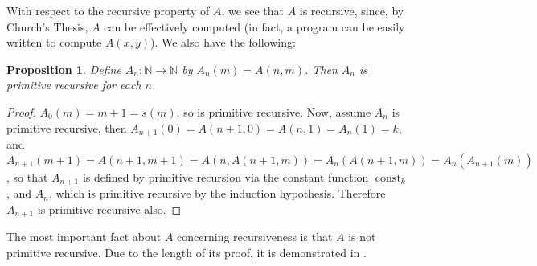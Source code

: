 \documentclass[12pt]{article}
\newtheorem{prop}{Proposition}
\begin{document}
With respect to the recursive property of $A$, we see that $A$ is recursive, since, by Church's Thesis, $A$ can be effectively computed (in fact, a program can be easily written to compute $A(x,y)$).  We also have the following:
\begin{prop} Define $A_n:\mathbb{N} \to \mathbb{N}$ by $A_n(m)= A(n,m)$.  Then $A_n$ is primitive recursive for each $n$.  \end{prop}
\begin{proof}  $A_0(m)=m+1=s(m)$, so is primitive recursive.  Now, assume $A_n$ is primitive recursive, then $A_{n+1}(0)=A(n+1,0)=A(n,1)=A_n(1)=k$, and $A_{n+1}(m+1)=A(n+1,m+1)=A(n,A(n+1,m))=A_n(A(n+1,m))=A_n(A_{n+1}(m))$, so that $A_{n+1}$ is defined by primitive recursion via the constant function $\operatorname{const}_k$, and $A_n$, which is primitive recursive by the induction hypothesis.  Therefore $A_{n+1}$ is primitive recursive also.
\end{proof}
The most important fact about $A$ concerning recursiveness is that $A$ is not primitive recursive.  Due to the length of its proof, it is demonstrated in .
\end{document}
